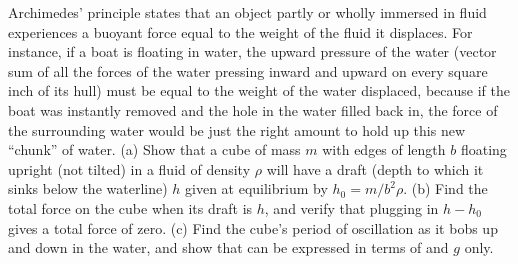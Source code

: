 Archimedes' principle states that an object partly or
wholly immersed in fluid experiences a buoyant force equal
to the weight of the fluid it displaces. For instance, if a
boat is floating in water, the upward pressure of the water
(vector sum of all the forces of the water pressing inward
and upward on every square inch of its hull) must be equal
to the weight of the water displaced, because if the boat
was instantly removed and the hole in the water filled back
in, the force of the surrounding water would be just the
right amount to hold up this new ``chunk'' of water. (a)
Show that a cube of mass $m$ with edges of length $b$
floating upright (not tilted) in a fluid of density $\rho $
will have a draft (depth to which it sinks below the
waterline) $h$ given at equilibrium by $h_0=m/b^2\rho$. (b) Find the total
force on the cube when its draft is $h$, and verify that
plugging in $h-h_0$ gives a total force of zero. (c) Find the
cube's period of oscillation as it bobs up and down in the
water, and show that can be expressed in terms of and $g$ only.
\answercheck
